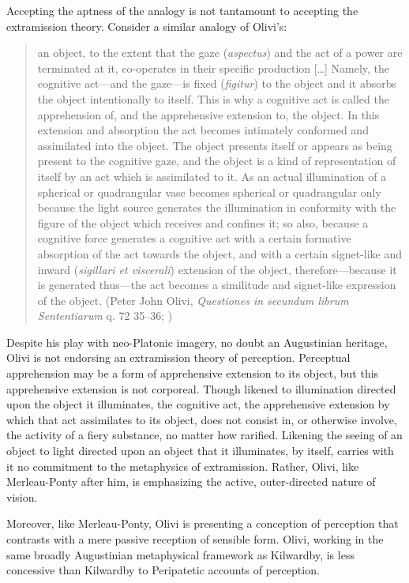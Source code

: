 Accepting the aptness of the analogy is not tantamount to accepting the extramission theory. Consider a similar analogy of Olivi's:
\begin{quote}
	an object, to the extent that the gaze (\emph{aspectus}) and the act of a power are terminated at it, co-operates in their specific production [\ldots] Namely, the cognitive act---and the gaze---is fixed (\emph{figitur}) to the object and it absorbs the object intentionally to itself. This is why a cognitive act is called the apprehension of, and the apprehensive extension to, the object. In this extension and absorption the act becomes intimately conformed and assimilated into the object. The object presents itself or appears as being present to the cognitive gaze, and the object is a kind of representation of itself by an act which is assimilated to it. As an actual illumination of a spherical or quadrangular vase becomes spherical or quadrangular only because the light source generates the illumination in conformity with the figure of the object which receives and confines it; so also, because a cognitive force generates a cognitive act with a certain formative absorption of the act towards the object, and with a certain signet-like and inward (\emph{sigillari et viscerali}) extension of the object, therefore---because it is generated thus---the act becomes a similitude and signet-like expression of the object. (Peter John Olivi, \emph{Questiones in secundum librum Sententiarum} q. 72 35--36; \citealt[146--147]{Toivanen:2013ul})
\end{quote}
Despite his play with neo-Platonic imagery, no doubt an Augustinian heritage, Olivi is not endorsing an extramission theory of perception. Perceptual apprehension may be a form of apprehensive extension to its object, but this apprehensive extension is not corporeal. Though likened to illumination directed upon the object it illuminates, the cognitive act, the apprehensive extension by which that act assimilates to its object, does not consist in, or otherwise involve, the activity of a fiery substance, no matter how rarified. Likening the seeing of an object to light directed upon an object that it illuminates, by itself, carries with it no commitment to the metaphysics of extramission. Rather, Olivi, like Merleau-Ponty after him, is emphasizing the active, outer-directed nature of vision.

Moreover, like Merleau-Ponty, Olivi is presenting a conception of perception that contrasts with a mere passive reception of sensible form. Olivi, working in the same broadly Augustinian metaphysical framework as Kilwardby, is less concessive than Kilwardby to Peripatetic accounts of perception. 

